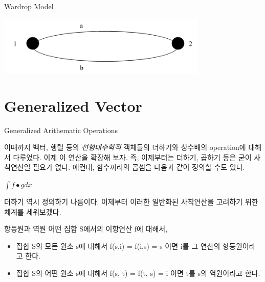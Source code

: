 \documentclass{beamer}
\begin{document}
\begin{frame}{Wardrop Model}

\includegraphics[width=10cm,keepaspectratio]{wardrop}

\end{frame} 







\section{Generalized Vector}


\begin{frame}{Generalized Arithematic Operations} 

이때까지 벡터, 행렬 등의 \textit{선형대수학적} 객체들의 더하기와 상수배의 operation에 대해서 다루었다. 이제 이 연산을 확장해 보자. 즉, 이제부터는 더하기, 곱하기 등은 굳이 사칙연산일 필요가 없다. 예컨대, 함수끼리의 곱셈을 다음과 같이 정의할 수도 있다. 

$\int f \bullet g dx $ 

더하기 역시 정의하기 나름이다. 이제부터 이러한 일반화된 사칙연산을 고려하기 위한 체계를 세워보겠다. 

\end{frame}






\begin{frame}{항등원과 역원} 
어떤 집합 S에서의 이항연산 f에 대해서, 

\begin{itemize} 
\item 집합 S의 모든 원소 s에 대해서 f(s,i) = f(i,s) = s 이면 i를 그 연산의 항등원이라고 한다. 
\item 집합 S의 어떤 원소 s에 대해서 f(s, t) = f(t, s) = i 이면 t를 s의 역원이라고 한다. 
\end{itemize}
\end{frame}
\end{document}
